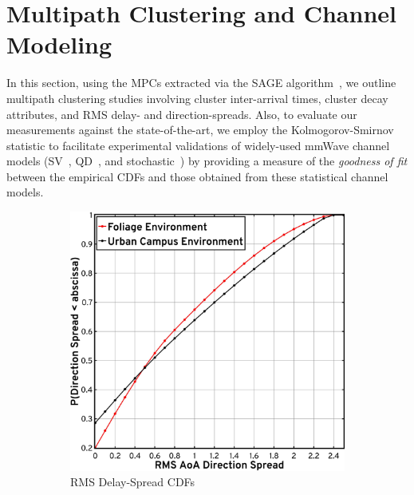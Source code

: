 \documentclass[10pt, twocolumn]{IEEEtran}
\begin{document}
{%
\section{Multipath Clustering and Channel Modeling}\label{S5}
In this section, using the MPCs extracted via the SAGE algorithm~\cite{SAGE}, we outline multipath clustering studies involving cluster inter-arrival times, cluster decay attributes, and RMS delay- and direction-spreads. Also, to evaluate our measurements against the state-of-the-art, we employ the Kolmogorov-Smirnov statistic to facilitate experimental validations of widely-used mmWave channel models (SV~\cite{Indoor60G}, QD~\cite{QDC_NIST}, and stochastic~\cite{Indoor60G}) by providing a measure of the \emph{goodness of fit} between the empirical CDFs and those obtained from these statistical channel models.
\begin{figure} [t]
    \centering
    \begin{subfigure}{0.495\linewidth}
        \centering
        \includegraphics[width=1.0\linewidth]{figs/rms_direction_spread.pdf}
        \caption{RMS Delay-Spread CDFs}
        \label{F11a}
    \end{subfigure}
    \begin{subfigure}{0.495\linewidth}
        \centering

\end{subfigure}
\end{figure}}
\end{document}
